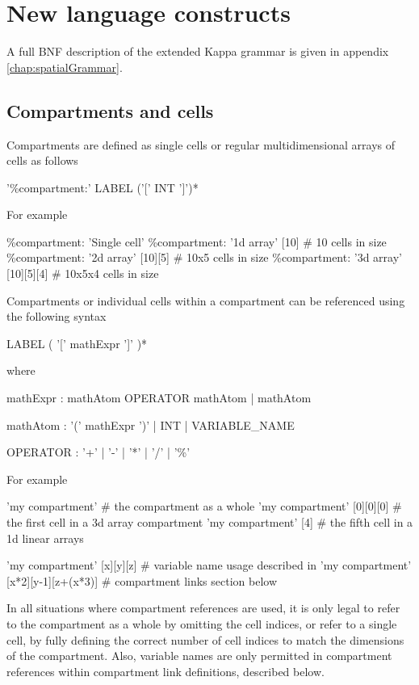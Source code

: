 \section{New language constructs}

A full BNF description of the extended Kappa grammar is given in appendix \ref{chap:spatialGrammar}.

\subsection{Compartments and cells}

Compartments are defined as single cells or regular multidimensional arrays of cells as follows
\begin{bnfsource}
'\%compartment:' LABEL ('[' INT ']')*
\end{bnfsource}
For example
\begin{kappasource}
\%compartment: 'Single cell' 
\%compartment: '1d array' [10]       # 10 cells in size 
\%compartment: '2d array' [10][5]    # 10x5 cells in size 
\%compartment: '3d array' [10][5][4] # 10x5x4 cells in size 
\end{kappasource}

Compartments or individual cells within a compartment can be referenced using the following syntax
\begin{bnfsource}
LABEL ( '[' mathExpr ']' )*
\end{bnfsource}
where
\begin{bnfsource}
mathExpr :
  mathAtom OPERATOR mathAtom
  | mathAtom
  
mathAtom :
  '(' mathExpr ')'
  | INT
  | VARIABLE_NAME
  
OPERATOR :
  '+' | '-' | '*' | '/' | '\%'
\end{bnfsource}
For example
\begin{kappasource}
'my compartment'                     # the compartment as a whole
'my compartment' [0][0][0]           # the first cell in a 3d array compartment
'my compartment' [4]                 # the fifth cell in a 1d linear arrays

'my compartment' [x][y][z]           # variable name usage described in
'my compartment' [x*2][y-1][z+(x*3)] #   compartment links section below
\end{kappasource}

In all situations where compartment references are used, it is only legal to refer to the compartment as a whole by omitting the cell indices, or refer to a single cell, by fully defining the correct number of cell indices to match the dimensions of the compartment. Also, variable names are only permitted in compartment references within compartment link definitions, described below.


